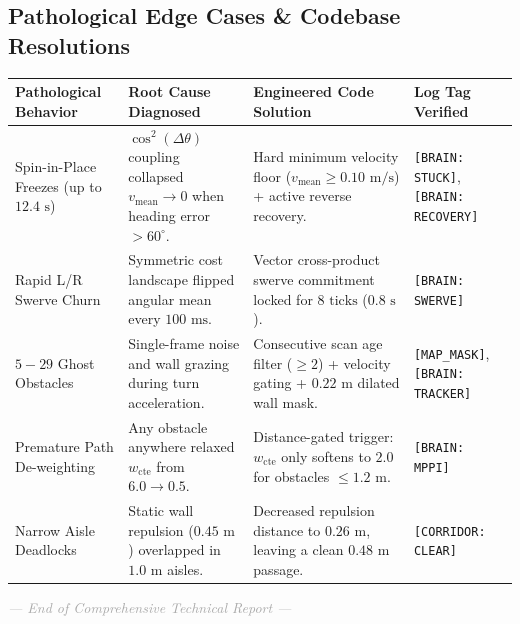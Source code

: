 \documentclass[10pt,a4paper]{article}
\begin{document}
\subsection{Pathological Edge Cases \& Codebase Resolutions}
\begin{center}
\footnotesize
\begin{tabular}{|p{3.2cm}|p{4.2cm}|p{4.8cm}|p{3.0cm}|}
\hline
\textbf{Pathological Behavior} & \textbf{Root Cause Diagnosed} & \textbf{Engineered Code Solution} & \textbf{Log Tag Verified} \\
\hline
Spin-in-Place Freezes (up to $12.4\text{ s}$) & $\cos^2(\Delta\theta)$ coupling collapsed $v_{\text{mean}} \to 0$ when heading error $> 60^\circ$. & Hard minimum velocity floor ($v_{\text{mean}} \ge 0.10\text{ m/s}$) + active reverse recovery. & \texttt{[BRAIN: STUCK]}, \texttt{[BRAIN: RECOVERY]} \\
\hline
Rapid L/R Swerve Churn & Symmetric cost landscape flipped angular mean every $100\text{ ms}$. & Vector cross-product swerve commitment locked for $8\text{ ticks}$ ($0.8\text{ s}$). & \texttt{[BRAIN: SWERVE]} \\
\hline
$5 - 29$ Ghost Obstacles & Single-frame noise and wall grazing during turn acceleration. & Consecutive scan age filter ($\ge 2$) + velocity gating + $0.22\text{ m}$ dilated wall mask. & \texttt{[MAP\_MASK]}, \texttt{[BRAIN: TRACKER]} \\
\hline
Premature Path De-weighting & Any obstacle anywhere relaxed $w_{\text{cte}}$ from $6.0 \to 0.5$. & Distance-gated trigger: $w_{\text{cte}}$ only softens to $2.0$ for obstacles $\le 1.2\text{ m}$. & \texttt{[BRAIN: MPPI]} \\
\hline
Narrow Aisle Deadlocks & Static wall repulsion ($0.45\text{ m}$) overlapped in $1.0\text{ m}$ aisles. & Decreased repulsion distance to $0.26\text{ m}$, leaving a clean $0.48\text{ m}$ passage. & \texttt{[CORRIDOR: CLEAR]} \\
\hline
\end{tabular}
\end{center}

\vspace{0.4cm}
\begin{center}
\footnotesize \textcolor{darkgray}{\textit{--- End of Comprehensive Technical Report ---}}
\end{center}
\end{document}
